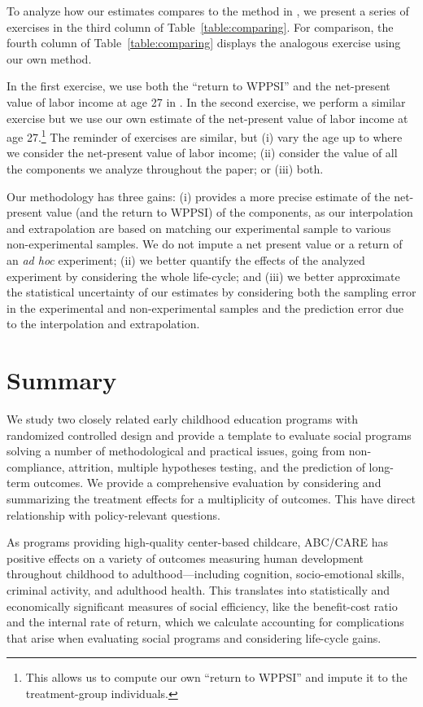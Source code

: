 To analyze how our estimates compares to the method in \citet{Kline_Walters_2016_QJE}, we present a series of exercises in the third column of Table~\ref{table:comparing}. For comparison, the fourth column of Table~\ref{table:comparing} displays the analogous exercise using our own method.

In the first exercise, we use both the ``return to WPPSI'' and the net-present value of labor income at age 27 in  \citet{Chetty_Friedman_etal_2011_QJoE}. In the second exercise, we perform a similar exercise but we use our own estimate of the net-present value of labor income at age 27.\footnote{This allows us to compute our own ``return to WPPSI'' and impute it to the treatment-group individuals.} The reminder of exercises are similar, but (i) vary the age up to where we consider the net-present value of labor income; (ii) consider the value of all the components we analyze throughout the paper; or (iii) both.

Our methodology has three gains: (i) provides a more precise estimate of the net-present value (and the return to WPPSI) of the components, as our interpolation and extrapolation are based on matching our experimental sample to various non-experimental samples. We do not impute a net present value or a return of an \textit{ad hoc} experiment; (ii) we better quantify the effects of the analyzed experiment by considering the whole life-cycle; and (iii) we better approximate the statistical uncertainty of our estimates by considering both the sampling error in the experimental and non-experimental samples and the prediction error due to the interpolation and extrapolation.

\section{Summary} \label{section:conclusion}

We study two closely related early childhood education programs with randomized controlled design and provide a template to evaluate social programs solving a number of methodological and practical issues, going from non-compliance, attrition, multiple hypotheses testing, and the prediction of long-term outcomes. We provide a comprehensive evaluation by considering and summarizing the treatment effects for a multiplicity of outcomes. This have direct relationship with policy-relevant questions.

As programs providing high-quality center-based childcare, ABC/CARE has positive effects on a variety of outcomes measuring human development throughout childhood to adulthood---including cognition, socio-emotional skills, criminal activity, and adulthood health. This translates into statistically and economically significant measures of social efficiency, like the benefit-cost ratio and the internal rate of return, which we calculate accounting for complications that arise when evaluating social programs and considering life-cycle gains.

